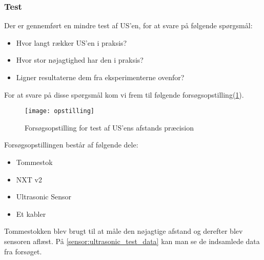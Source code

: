 \subsubsection{Test}
Der er gennemført en mindre test af US'en, for at svare på følgende spørgsmål:

\begin{itemize}
\item Hvor langt rækker US'en i praksis?
\item Hvor stor nøjagtighed har den i praksis?
\item Ligner resultaterne dem fra eksperimenterne ovenfor?
\end{itemize}

For at svare på disse spørgsmål kom vi frem til følgende forsøgsopstilling(\ref{sensor:ultrasonic_opstilling}).

\begin{figure}[h]
\centering
\texttt{[image: opstilling]}
\caption{Forsøgsopstilling for test af US'ens afstands præcision}
\label{sensor:ultrasonic_opstilling}
\end{figure}

Forsøgsopstillingen består af følgende dele:
\begin{itemize}
\item Tommestok
\item NXT v2
\item \legoms Ultrasonic Sensor
\item Et \legoms kabler
\end{itemize}

Tommestokken blev brugt til at måle den nøjagtige afstand og derefter blev sensoren aflæst.
På \ref{sensor:ultrasonic_test_data} kan man se de indsamlede data fra forsøget.

